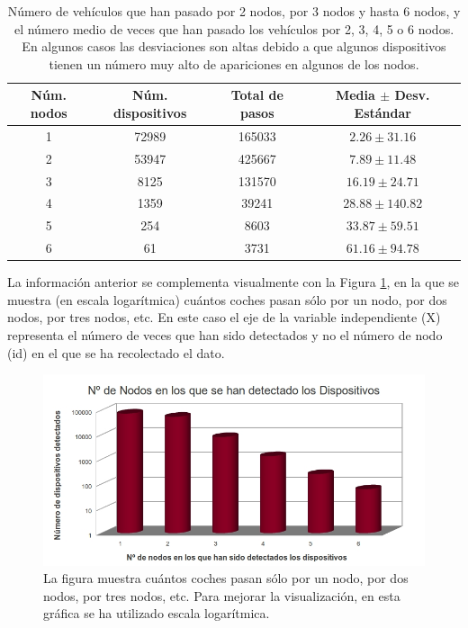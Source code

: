 \documentclass[twocolumn,twoside]{Jornadas}
\begin{document}
 \begin{table}[hptb]
 \caption{Número de vehículos que han pasado por 2 nodos, por 3 nodos y hasta 6 nodos, y el número medio de veces que han pasado los vehículos por 2, 3, 4, 5 o 6 nodos. En algunos casos las desviaciones son altas debido a que algunos dispositivos tienen un número muy alto de apariciones en algunos de los nodos.
 \label{tNodosPorDondePasan}}
 \begin{center}
 \begin{tabular}{|c|c|c|c|}
 \hline
 Núm. nodos & 	Núm. dispositivos & 	Total de pasos & 	Media $\pm$ Desv. Estándar  \\
 \hline
1 & 	72989 & 	 165033 & 	$2.26 \pm 31.16$  \\
 \hline
2 & 	53947 & 	 425667 & 	$7.89 \pm 11.48$  \\
 \hline
3 & 	8125 & 	 131570 & 	$16.19 \pm 24.71$  \\
 \hline
4 & 	1359 & 	 39241 & 	$28.88 \pm 140.82$  \\
 \hline
5 & 	254 & 	 8603 & 	$33.87 \pm 59.51$  \\
 \hline
6 & 	61 & 	 3731 & 	$61.16 \pm 94.78$  \\
 \hline
 \end{tabular}
 \end{center}
 \end{table}

La información anterior se complementa visualmente con la Figura \ref{fNodosPorDondePasan}, en la que se muestra (en escala logarítmica) cuántos coches pasan sólo 
por un nodo, por dos nodos, por tres nodos, etc. En este caso el eje de la variable independiente (X) representa el número de veces que han sido detectados y no el número de nodo (id) en el que se ha 
recolectado el dato.

 \begin{figure}[htb]
 \begin{center}
 \includegraphics[scale=0.20]{NodosPorDondePasan.jpg}
 \caption{La figura muestra cuántos coches pasan sólo por un nodo, por dos nodos, por tres nodos, etc. Para mejorar la visualización, en esta gráfica se ha utilizado escala logarítmica.
 \label{fNodosPorDondePasan}}
 \end{center}
 \end{figure}
\end{document}
